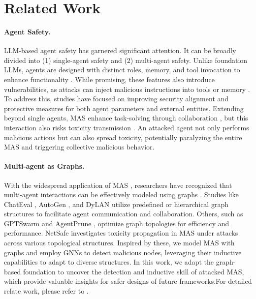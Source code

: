 \section{Related Work}
\vspace{-0.2em}


\paragraph{Agent Safety.} LLM-based agent safety has garnered significant attention. It can be broadly divided into (1) single-agent safety and (2) multi-agent safety. Unlike foundation LLMs, agents are designed with distinct roles, memory, and tool invocation to enhance functionality \cite{guo2024large, wang2024survey}. While promising, these features also introduce vulnerabilities, as attacks can inject malicious instructions into tools \cite{greshake2023not, liu2023prompt, tian2023evil} or memory \cite{zhang2024psysafe}. To address this, studies \cite{inan2023llama, xie2023defending, liu2024protecting, zhang2024intention, zhang2024parden, phute2023llm} have focused on improving security alignment and protective measures for both agent parameters and external entities. Extending beyond single agents, MAS enhance task-solving through collaboration \cite{li2023camel, qian2023communicative}, but this interaction also risks toxicity transmission \cite{tian2023evil, chern2024combating, yu2024netsafe, gu2024agent}. An attacked agent not only performs malicious actions but can also spread toxicity, potentially paralyzing the entire MAS and triggering collective malicious behavior.

\vspace{-0.5em}
\paragraph{Multi-agent as Graphs.} With the widespread application of MAS \cite{chan2023chateval, chen2023gamegpt, cohen2023lm, chen2023agentverse, hua2023war, park2023generative}, researchers have recognized that multi-agent interactions can be effectively modeled using graphs \cite{chen2023agentverse, liu2023dynamic, qian2024scaling, zhugegptswarm}. Studies like ChatEval \cite{chan2023chateval}, AutoGen \cite{wu2023autogen}, and DyLAN \cite{liu2023dynamic} utilize predefined or hierarchical graph structures to facilitate agent communication and collaboration. Others, such as GPTSwarm \cite{zhugegptswarm} and AgentPrune \cite{zhang2024cut}, optimize graph topologies for efficiency and performance. NetSafe \cite{yu2024netsafe} investigates toxicity propagation in MAS under attacks across various topological structures. Inspired by these, we model MAS with graphs and employ GNNs to detect malicious nodes, leveraging their inductive capabilities to adapt to diverse structures. In this work, we adapt the graph-based foundation to uncover the detection and inductive skill of attacked MAS, which provide valuable insights for safer designs of future frameworks.For detailed relate work, please refer to .